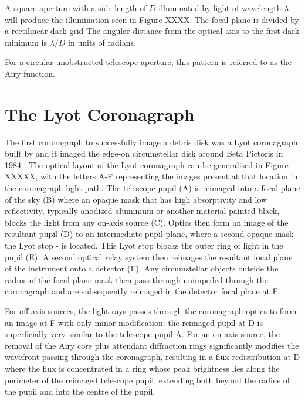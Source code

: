 \documentclass[letterpaper]{ar-1col}
\begin{document}
A square aperture with a side length of $D$ illuminated by light of wavelength $\lambda$ will produce the illumination seen in Figure XXXX.
%
The focal plane is divided by a rectilinear dark grid
%
The angular distance from the optical axis to the first dark minimum is $\lambda/D$ in units of radians.

For a circular unobstructed telescope aperture, this pattern is referred to as the Airy function.

\section{The Lyot Coronagraph}

The first coronagraph to successfully image a debris disk was a Lyot coronagraph built by \citet{Vilas87} and it imaged the edge-on circumstellar disk around Beta Pictoris in 1984 \citep{Smith84}.
%
The optical layout of the Lyot coronagraph can be generalised in Figure XXXXX, with the letters A-F representing the images present at that location in the coronagraph light path.
%
The telescope pupil (A) is reimaged into a focal plane of the sky (B) where an opaque mask that has high absorptivity and low reflectivity, typically anodized aluminium or another material painted black, blocks the light from any on-axis source (C).
%
Optics then form an image of the resultant pupil (D) to an intermediate pupil plane, where a second opaque mask - the Lyot stop - is located.
%
This Lyot stop blocks the outer ring of light in the pupil (E).
%
A second optical relay system then reimages the resultant focal plane of the instrument onto a detector (F).
%
%
Any circumstellar objects outside the radius of the focal plane mask then pass through unimpeded through the coronagraph and are subsequently reimaged in the detector focal plane at F.

For off axis sources, the light rays passes through the coronagraph optics to form an image at F with only minor modification: the reimaged pupil at D is superficially very similar to the telescope pupil A.
%
For an on-axis source, the removal of the Airy core plus attendant diffraction rings significantly modifies the wavefront passing through the coronagraph, resulting in a flux redistribution at D where the flux is concentrated in a ring whose peak brightness lies along the perimeter of the reimaged telescope pupil, extending both beyond the radius of the pupil and into the centre of the pupil.
\end{document}

